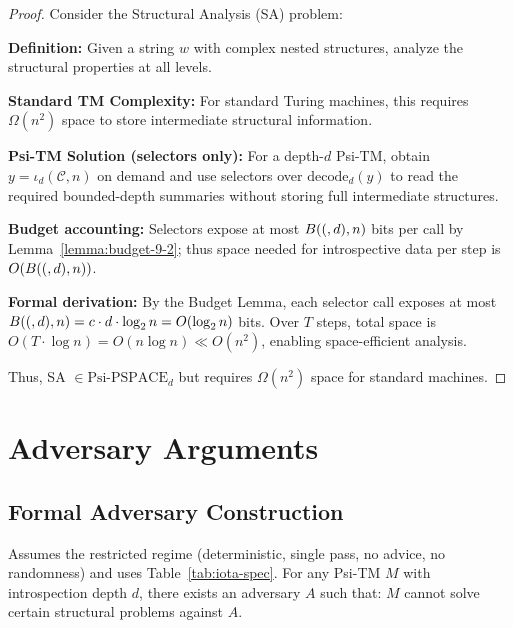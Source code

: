 \begin{proof}
Consider the Structural Analysis (SA) problem:

\textbf{Definition:} Given a string $w$ with complex nested structures, analyze the structural properties at all levels.

\textbf{Standard TM Complexity:}
For standard Turing machines, this requires $\Omega(n^2)$ space to store intermediate structural information.

\textbf{Psi-TM Solution (selectors only):}
For a depth-$d$ Psi-TM, obtain $y=\iota_d(\mathcal{C},n)$ on demand and use selectors over $\mathrm{decode}_d(y)$ to read the required bounded-depth summaries without storing full intermediate structures.

\textbf{Budget accounting:}
Selectors expose at most $B((,d),n)$ bits per call by Lemma~\ref{lemma:budget-9-2}; thus space needed for introspective data per step is $O(B((,d),n))$.

\textbf{Formal derivation:} By the Budget Lemma, each selector call exposes at most $\B(d,n) = c \cdot d \cdot \log n = O(\log n)$ bits. Over $T$ steps, total space is $O(T \cdot \log n) = O(n \log n) \ll O(n^2)$, enabling space-efficient analysis.

Thus, SA $\in \text{Psi-PSPACE}_d$ but requires $\Omega(n^2)$ space for standard machines.
\end{proof}

\section{Adversary Arguments}

\subsection{Formal Adversary Construction}

\begin{theorem}
Assumes the restricted regime (deterministic, single pass, no advice, no randomness) and uses Table~\ref{tab:iota-spec}.
For any Psi-TM $M$ with introspection depth $d$, there exists an adversary $A$ such that:
$M$ cannot solve certain structural problems against $A$.
\end{theorem}

